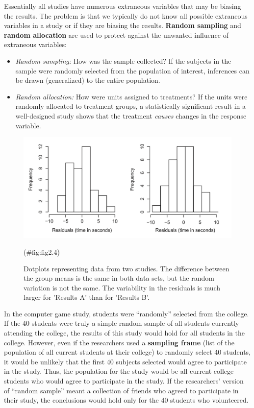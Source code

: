 \documentclass[
]{report}
\begin{document}
Essentially all studies have numerous extraneous variables that may be biasing the results. The problem is that we typically do not know all possible extraneous variables in a study or if they are biasing the results. \textbf{Random sampling} and \textbf{random allocation} are used to protect against the unwanted influence of extraneous variables:

\begin{itemize}
\item
  \emph{Random sampling:} How was the sample collected? If the subjects in the sample were randomly selected from the population of interest, inferences can be drawn (generalized) to the entire population.
\item
  \emph{Random allocation:} How were units assigned to treatments? If the units were randomly allocated to treatment groups, a statistically significant result in a well-designed study shows that the treatment \emph{causes} changes in the response variable.
\end{itemize}

\begin{figure}

{\centering \includegraphics[width=1\linewidth]{docs/Fig2_4} 

}

\caption{Dotplots representing data from two studies. The difference between the group means is the same in both data sets, but the random variation is not the same. The variability in the residuals is much larger for 'Results A' than for 'Results B'.}(\#fig:fig2.4)
\end{figure}

In the computer game study, students were ``randomly'' selected from the college. If the 40 students were truly a simple random sample of all students currently attending the college, the results of this study would hold for all students in the college. However, even if the researchers used a \textbf{sampling frame} (list of the population of all current students at their college) to randomly select 40 students, it would be unlikely that the first 40 subjects selected would agree to participate in the study. Thus, the population for the study would be all current college students who would agree to participate in the study. If the researchers' version of ``random sample'' meant a collection of friends who agreed to participate in their study, the conclusions would hold only for the 40 students who volunteered.
\end{document}
